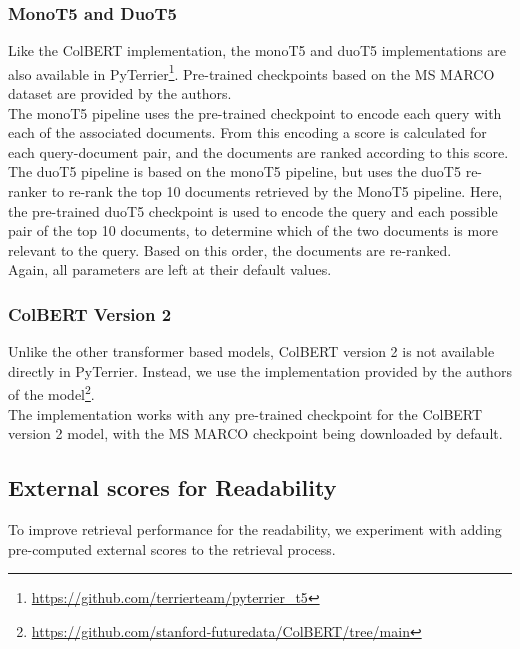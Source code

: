 \subsubsection{MonoT5 and DuoT5}
Like the ColBERT implementation, the monoT5 and duoT5 implementations are also available in PyTerrier\footnote{\url{https://github.com/terrierteam/pyterrier_t5}}.
Pre-trained checkpoints based on the MS MARCO dataset are provided by the authors.
\\
The monoT5 pipeline uses the pre-trained checkpoint to encode each query with each of the associated documents.
From this encoding a score is calculated for each query-document pair, and the documents are ranked according to this score.
\\
The duoT5 pipeline is based on the monoT5 pipeline, but uses the duoT5 re-ranker to re-rank the top 10 documents retrieved by the MonoT5 pipeline.
Here, the pre-trained duoT5 checkpoint is used to encode the query and each possible pair of the top 10 documents, to determine which of the two documents is more relevant to the query.
Based on this order, the documents are re-ranked.
\\
Again, all parameters are left at their default values.

\subsubsection{ColBERT Version 2}
Unlike the other transformer based models, ColBERT version 2 is not available directly in PyTerrier.
Instead, we use the implementation provided by the authors of the model\footnote{\url{https://github.com/stanford-futuredata/ColBERT/tree/main}}.
\\
The implementation works with any pre-trained checkpoint for the ColBERT version 2 model, with the MS MARCO checkpoint being downloaded by default.

\subsection{External scores for Readability}\label{sec:external-scores}
To improve retrieval performance for the readability, we experiment with adding pre-computed external scores to the retrieval process.

